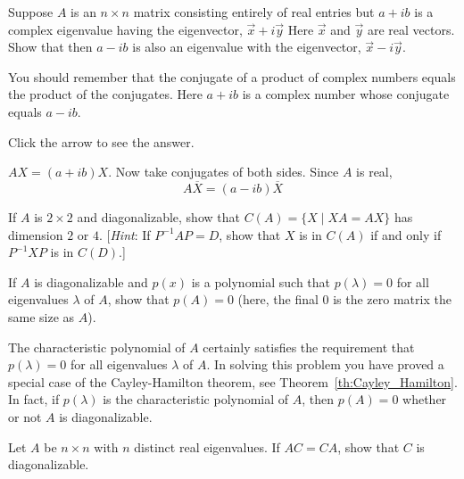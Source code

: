 \documentclass{ximera}
\begin{document}
\begin{problem}\label{prb:8.32} Suppose $A$ is an $n\times n$ matrix consisting entirely of real
entries but $a+ib$ is a complex eigenvalue having the eigenvector, $\vec{x}+i\vec{y}$ Here $\vec{x}$ and $\vec{y}$ are real vectors. Show
that then $a-ib$ is also an eigenvalue with the eigenvector, $\vec{x}-i\vec{y}$.

\begin{hint}
You should remember that the conjugate of a
product of complex numbers equals the product of the conjugates. Here $a+ib$
is a complex number whose conjugate equals $a-ib.$


Click the arrow to see the answer.
\begin{expandable}
$AX=\left(
a+ib\right)X$. Now take conjugates of both sides. Since $A$ is
real,
\[
A\overline{X}=\left( a-ib\right) \overline{X}
\]
\end{expandable}
 
\end{hint}
\end{problem}



\begin{problem}\label{prb:2x2diagonalizable}
If $A$ is $2 \times 2$ and diagonalizable, show that $C(A) = \{X \mid XA = AX\}$ has dimension $2$ or $4$. [\textit{Hint}: If $P^{-1}AP = D$, show that $X$ is in $C(A)$ if and only if $P^{-1}XP$ is in $C(D)$.]
\end{problem}

\begin{problem}\label{prb:2x2diagonalizable_poly}
If $A$ is diagonalizable and $p(x)$ is a polynomial such that $p(\lambda) = 0$ for all eigenvalues $\lambda$ of $A$, show that $p(A) = 0$ (here, the final 0 is the zero matrix the same size as $A$).
\begin{remark}
The characteristic polynomial of $A$ certainly satisfies the requirement that $p(\lambda) = 0$ for all eigenvalues $\lambda$ of $A$.  In solving this problem you have proved a special case of the Cayley-Hamilton theorem, see Theorem~\ref{th:Cayley_Hamilton}.  In fact, if $p(\lambda)$ is the characteristic polynomial of $A$, then $p(A) = 0$ whether or not $A$ is diagonalizable.
\end{remark}
\end{problem}

\begin{problem}
Let $A$ be $n \times n$ with $n$ distinct real eigenvalues. If $AC = CA$, show that $C$ is diagonalizable.
\end{problem}
\end{document}
